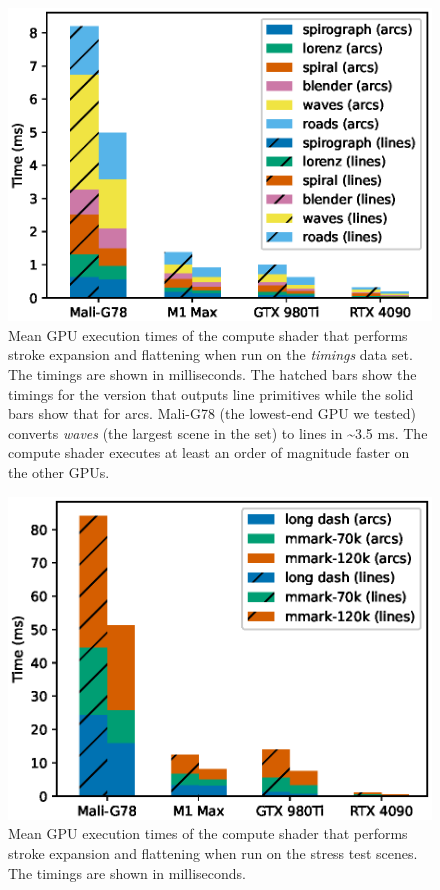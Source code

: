 \documentclass[sigconf, nonacm]{acmart}
\begin{document}
\begin{figure}
    \includegraphics[scale=0.69]{nehab_gpu_timings_strong}
    \caption{Mean GPU execution times of the compute shader that performs stroke expansion and flattening when run on the \citet{Nehab2020} \emph{timings} data set. The timings are shown in milliseconds. The hatched bars show the timings for the version that outputs line primitives while the solid bars show that for arcs. Mali-G78 (the lowest-end GPU we tested) converts \emph{waves} (the largest scene in the set) to lines in \textasciitilde3.5 ms. The compute shader executes at least an order of magnitude faster on the other GPUs.}
    \label{fig:nehab-gpu-timings}
\end{figure}

\begin{figure}
    \includegraphics[scale=0.73]{test_scenes_gpu_timings_strong}
    \caption{Mean GPU execution times of the compute shader that performs stroke expansion and flattening when run on the stress test scenes. The timings are shown in milliseconds.}
    \label{fig:test-scenes-gpu-timings}
\end{figure}
\end{document}
